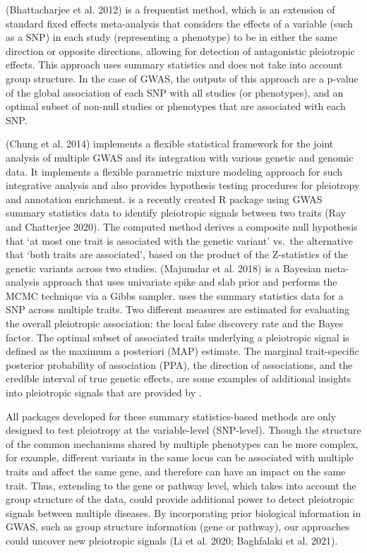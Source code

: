  (Bhattacharjee et al. 2012) is a frequentist method, which is an extension of standard fixed effects meta-analysis that considers the effects of a variable (such as a SNP) in each study (representing a phenotype) to be in either the same direction or opposite directions, allowing for detection of antagonistic pleiotropic effects. This approach uses summary statistics and does not take into account group structure. In the case of GWAS, the outputs of this approach are a p-value of the global association of each SNP with all studies (or phenotypes), and an optimal subset of non-null studies or phenotypes that are associated with each SNP.

 (Chung et al. 2014) implements a flexible statistical framework for the joint analysis of multiple GWAS and
its integration with various genetic and genomic data. It implements a flexible parametric mixture modeling approach for such integrative analysis and also provides hypothesis testing procedures for
pleiotropy and annotation enrichment.
 is a recently created R package using GWAS summary statistics data to identify pleiotropic signals between two traits (Ray and Chatterjee 2020). The computed method derives a composite null hypothesis
that `at most one trait is associated with the genetic variant' vs.~the alternative that `both traits are associated', based on the product of the Z-statistics of the genetic variants across two studies.  (Majumdar et al. 2018) is a Bayesian meta-analysis approach that uses univariate spike and slab prior and performs the MCMC technique via a Gibbs sampler.  uses the summary statistics data for a SNP across multiple traits. Two different measures are estimated for evaluating the overall pleiotropic association:
the local false discovery rate and the Bayes factor. The optimal subset of associated traits underlying a pleiotropic signal is defined as the maximum a posteriori (MAP) estimate. The marginal trait-specific posterior probability of association (PPA), the direction of associations, and the credible interval of true genetic effects, are some examples of additional insights into pleiotropic signals that are provided by .

All packages developed for these summary statistics-based methods are only designed to test pleiotropy at the variable-level (SNP-level). Though the structure of the common mechanisms shared by multiple phenotypes can be more complex, for example, different variants in the same locus can be associated with multiple traits
and affect the same gene, and therefore can have an impact on the same trait.
Thus, extending  to the gene or pathway level, which takes into account the group structure of the data, could provide additional power to detect pleiotropic signals between multiple diseases. By incorporating prior biological information in GWAS, such as group structure information (gene or pathway), our approaches could uncover new pleiotropic signals (Li et al. 2020; Baghfalaki et al. 2021).

